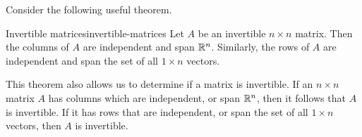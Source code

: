 Consider the following useful theorem.

\begin{theorem}{Invertible matrices}{invertible-matrices}
Let $A$ be an invertible $n \times n$ matrix. Then the columns of $A$ are independent and span $\mathbb{R}^n$. Similarly, the rows of $A$ are independent and span the set of all $1 \times n$ vectors. 
\end{theorem}

This theorem also allows us to determine if a matrix is invertible. If an $n \times n$ matrix $A$ has columns which are independent, or span $\mathbb{R}^n$, then it follows that $A$ is invertible. If it has rows that are independent, or span the set of all $1 \times n$ vectors, then $A$ is invertible.

